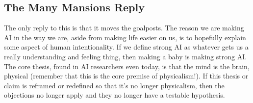 \subsection{The Many Mansions Reply}

    The only reply to this is that it moves the goalposts. The reason we are making AI in the way we are, aside from making life easier on us, is to hopefully explain some aspect of human intentionality. If we define strong AI as whatever gets us a really understanding and feeling thing, then making a baby is making strong AI. The core thesis, found in AI researchers even today, is that the mind is the brain, physical (remember that this is the core premise of physicalism!).  If this thesis or claim is reframed or redefined so that it's no longer physicalism, then the objections no longer apply and they no longer have a testable hypothesis. 
